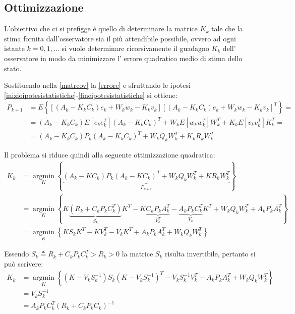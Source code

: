 \subsection{Ottimizzazione}
L'obiettivo che ci si prefigge è quello di determinare la matrice $K_k$ tale che la stima fornita dall'osservatore sia il più attendibile possibile, ovvero ad ogni istante $k=0,1,...$ si vuole determinare ricorsivamente il guadagno $K_k$ dell' osservatore in modo da minimizzare l' errore quadratico medio di stima dello stato.

Sostituendo nella \eqref{matrcov} la \eqref{errore} e sfruttando le ipotesi \eqref{inizioipotesistatistiche}-\eqref{fineipotesistatistiche} si ottiene: 
\begin{equation}
\begin{split}
P_{k+1} &= E\left\{[(A_k - K_k C_k) e_k + W_k w_k - K_k v_k][(A_k -K_k C_k)e_k+W_k w_k-K_k v_k]^T\right\}=\\
 &= (A_k-K_kC_k)E[e_ke^T_k](A_k-K_kC_k)^T +W_kE[w_kw^T_k]W^T_k + K_kE[v_kv^T_k]K^T_k=\\
&= (A_k-K_kC_k)P_k(A_k-K_kC_k)^T + W_kQ_kW^T_k+K_kR_kW^T_k
\end{split}
\end{equation}

\noindent Il problema si riduce quindi alla seguente ottimizzazione quadratica: 
\begin{equation}
\begin{split}
K_k &= \underset{K}{\operatorname{argmin}} \left\{ \underbrace{(A_k-KC_k)P_k(A_k-KC_k)^T + W_kQ_kW^T_k+KR_kW^T_k}_{P_{k+1}} \right\} \\
&= \underset{K}{\operatorname{argmin}} \left\{ K\underbrace{(R_k+C_kP_kC_k^T)}_{S_k}K^T-K\underbrace{C_kP_kA_k^T}_{V^T_k}-\underbrace{A_kP_kC_k^T}_{V_k}K^T+W_kQ_kW_k^T+A_kP_kA_k^T \right\} \\
&=  \underset{K}{\operatorname{argmin}} \left\{KS_kK^T-KV^T_k-V_kK^T+A_kP_kA_k^T+W_kQ_kW_k^T\right\}
\end{split}
\end{equation}

\noindent Essendo $S_k \triangleq R_k+C_kP_kC_k^T > R_k > 0 $ la matrice $S_k$ risulta invertibile, pertanto si può scrivere: 
\begin{equation}
\begin{split}
K_k &= \underset{K}{\operatorname{argmin}} \left\{(K-V_kS^{-1}_k)S_k(K-V_kS^{-1}_k)^T - V_kS^{-1}_kV^T_k + A_kP_kA_k^T + W_kQ_kW_k^T\right\}\\ 
&= V_kS^{-1}_k\\
&= A_kP_kC_k^T(R_k+C_kP_kC_k)^{-1}
\end{split}
\end{equation}

